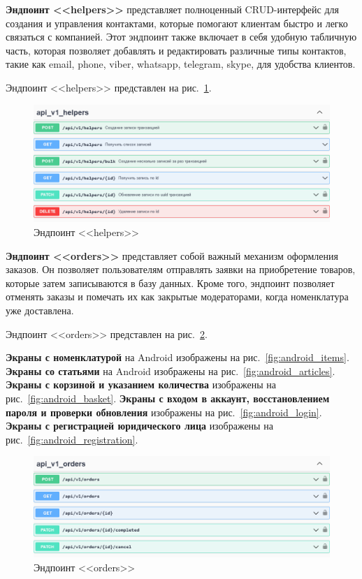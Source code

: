 \textbf{Эндпоинт <<helpers>>} представляет полноценный CRUD-интерфейс для создания и управления контактами,
которые помогают клиентам быстро и легко связаться с компанией.
Этот эндпоинт также включает в себя удобную табличную часть,
которая позволяет добавлять и редактировать различные типы контактов,
такие как email, phone, viber, whatsapp, telegram, skype, для удобства клиентов.

Эндпоинт <<helpers>> представлен на рис.~\ref{fig:swagger_helpers}.

\begin{figure}[!p]
    \centering

    \includegraphics[width=16cm]
    {images/swagger/helpers.png}

    \caption{Эндпоинт <<helpers>>}

    \label{fig:swagger_helpers}
\end{figure}

\textbf{Эндпоинт <<orders>>} представляет собой важный механизм оформления заказов.
Он позволяет пользователям отправлять заявки на приобретение товаров,
которые затем записываются в базу данных.
Кроме того, эндпоинт позволяет отменять заказы и помечать их как закрытые модераторами, когда номенклатура уже доставлена. 

Эндпоинт <<orders>> представлен на рис.~\ref{fig:swagger_orders}.

\textbf{Экраны с номенклатурой} на Android изображены на рис.~\ref{fig:android_items}.
\textbf{Экраны со статьями} на Android изображены на рис.~\ref{fig:android_articles}.
\textbf{Экраны с корзиной и указанием количества} изображены на рис.~\ref{fig:android_basket}.
\textbf{Экраны с входом в аккаунт, восстановлением пароля и проверки обновления} изображены на рис.~\ref{fig:android_login}.
\textbf{Экраны с регистрацией юридического лица} изображены на рис.~\ref{fig:android_registration}.

\begin{figure}[!p]
    \centering

    \includegraphics[width=16cm]
    {images/swagger/orders.png}

    \caption{Эндпоинт <<orders>>}

    \label{fig:swagger_orders}
\end{figure}

